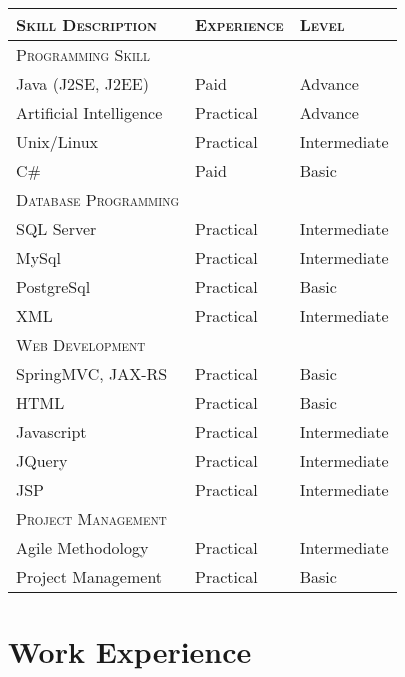 \documentclass[a4paper,10pt]{article} %
\begin{document}
    \begin{tabular}{l|l|l}
   
    \textsc{Skill Description} & \textsc{Experience}  & \textsc{Level} \\ \hline
    \textsc{Programming Skill}\\ \hline
    Java (J2SE, J2EE) & Paid & Advance \\
    Artificial Intelligence & Practical & Advance \\ 
    Unix/Linux & Practical & Intermediate \\ 
    C\# & Paid & Basic \\  \hline 
    \textsc{Database Programming} \\ \hline
    SQL Server & Practical & Intermediate \\ 
    MySql & Practical & Intermediate \\ 
    PostgreSql & Practical & Basic \\ 
    XML & Practical & Intermediate \\ \hline
    \textsc{Web Development} \\ \hline
    SpringMVC, JAX-RS & Practical & Basic \\ 
    HTML & Practical & Basic \\ 
    Javascript & Practical & Intermediate \\ 
    JQuery & Practical & Intermediate \\ 
    JSP & Practical & Intermediate \\ \hline
    \textsc{Project Management}\\ \hline
    Agile Methodology & Practical & Intermediate \\ 
    Project Management & Practical & Basic \\ \hline
    \end{tabular}





\section{Work Experience}
\end{document}

